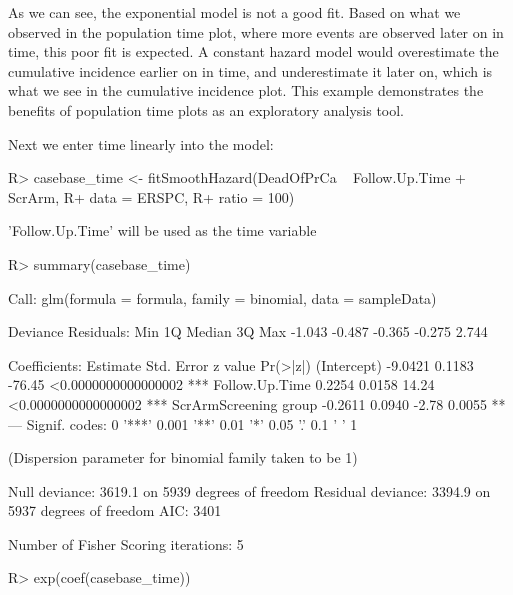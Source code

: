 \documentclass[article]{jss}
\begin{document}
As we can see, the exponential model is not a good fit. Based on what we
observed in the population time plot, where more events are observed
later on in time, this poor fit is expected. A constant hazard model
would overestimate the cumulative incidence earlier on in time, and
underestimate it later on, which is what we see in the cumulative
incidence plot. This example demonstrates the benefits of population
time plots as an exploratory analysis tool.

Next we enter time linearly into the model:

\begin{CodeChunk}

\begin{CodeInput}
R> casebase_time <- fitSmoothHazard(DeadOfPrCa ~ Follow.Up.Time + ScrArm, 
R+                                  data = ERSPC, 
R+                                  ratio = 100)
\end{CodeInput}

\begin{CodeOutput}
'Follow.Up.Time' will be used as the time variable
\end{CodeOutput}

\begin{CodeInput}
R> summary(casebase_time)
\end{CodeInput}

\begin{CodeOutput}

Call:
glm(formula = formula, family = binomial, data = sampleData)

Deviance Residuals: 
   Min      1Q  Median      3Q     Max  
-1.043  -0.487  -0.365  -0.275   2.744  

Coefficients:
                      Estimate Std. Error z value            Pr(>|z|)    
(Intercept)            -9.0421     0.1183  -76.45 <0.0000000000000002 ***
Follow.Up.Time          0.2254     0.0158   14.24 <0.0000000000000002 ***
ScrArmScreening group  -0.2611     0.0940   -2.78              0.0055 ** 
---
Signif. codes:  0 '***' 0.001 '**' 0.01 '*' 0.05 '.' 0.1 ' ' 1

(Dispersion parameter for binomial family taken to be 1)

    Null deviance: 3619.1  on 5939  degrees of freedom
Residual deviance: 3394.9  on 5937  degrees of freedom
AIC: 3401

Number of Fisher Scoring iterations: 5
\end{CodeOutput}

\begin{CodeInput}
R> exp(coef(casebase_time))
\end{CodeInput}


\end{CodeChunk}
\end{document}
